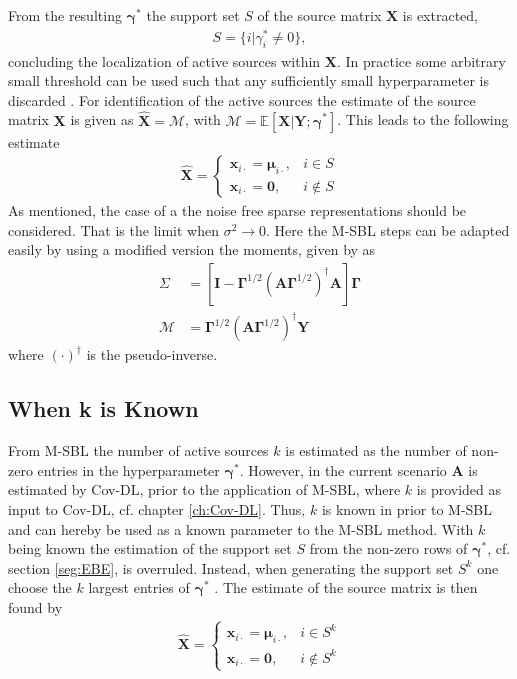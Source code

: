 From the resulting $\boldsymbol{\gamma}^\ast$ the support set $S$ of the source matrix $\mathbf{X}$ is extracted, 
\begin{align*}
S = \{ i \vert \gamma_i^{\ast} \neq 0 \},
\end{align*}
concluding the localization of active sources within $\mathbf{X}$. 
In practice some arbitrary small threshold can be used such that any sufficiently small hyperparameter is discarded \cite[p.149]{phd_wipf}.
For identification of the active sources the estimate of the source matrix $\mathbf{X}$ is given as $\hat{\mathbf{X}} = \mathcal{M} $, with $\mathcal{M} = \mathbb{E}[\mathbf{X}\vert \mathbf{Y} ; \boldsymbol{\gamma}^{\ast}]$. 
This leads to the following estimate  
\begin{align*}
\hat{\mathbf{X}} = 
\begin{cases}
\mathbf{x}_{i\cdot} = \boldsymbol{\mu}_{i \cdot}, & i \in S \\
\mathbf{x}_{i\cdot} = \mathbf{0}, & i \not \in S
\end{cases}
\end{align*}
As mentioned, the case of a the noise free sparse representations should be considered. 
That is the limit when $\sigma^2 \rightarrow 0$. Here the M-SBL steps can be adapted easily by using a modified version the moments, given by \cite[p.148]{phd_wipf} as 
\begin{align*}
\Sigma &= \left[ \textbf{I} - \boldsymbol{\Gamma}^{1/2} \left( \mathbf{A} \boldsymbol{\Gamma}^{1/2}\right)^{\dagger} \mathbf{A} \right]\boldsymbol{\Gamma}\\
\mathcal{M} &= \boldsymbol{\Gamma}^{1/2}\left( \mathbf{A} \boldsymbol{\Gamma}^{1/2}\right)^{\dagger} \mathbf{Y}
\end{align*} 
where $(\cdot)^{\dagger}$ is the pseudo-inverse.

\subsection{When k is Known}\label{subsec:kestimate}
From M-SBL the number of active sources $k$ is estimated as the number of non-zero entries in the hyperparameter $\boldsymbol{\gamma}^{\ast}$.
However, in the current scenario $\mathbf{A}$ is estimated by Cov-DL, prior to the application of M-SBL, where $k$ is provided as input to Cov-DL, cf. chapter \ref{ch:Cov-DL}.
Thus, $k$ is known in prior to M-SBL and can hereby be used as a known parameter to the M-SBL method. 
With $k$ being known the estimation of the support set $S$ from the non-zero rows of $\boldsymbol{\gamma}^{\ast}$, cf. section \ref{seg:EBE}, is overruled.
Instead, when generating the support set $S^k$ one choose the $k$ largest entries of $\boldsymbol{\gamma}^{\ast}$ \cite[p. 3]{Balkan2014}.
The estimate of the source matrix is then found by
\begin{align*}
\hat{\mathbf{X}} = 
\begin{cases}
\mathbf{x}_{i\cdot} = \boldsymbol{\mu}_{i \cdot}, & i \in S^k \\
\mathbf{x}_{i\cdot} = \mathbf{0}, & i \not \in S^k
\end{cases}
\end{align*}

